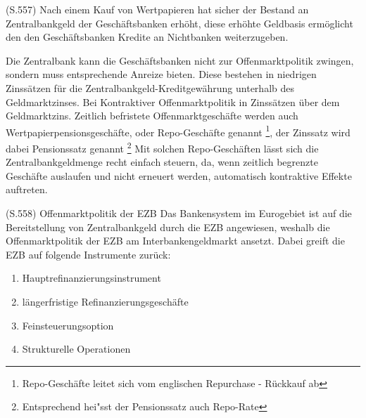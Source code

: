 \documentclass[
    onecolumn,
    a4paper,
    abstracton,
    parskip=half
    ,final
    ]{scrartcl}
\begin{document}
(S.557)
Nach einem Kauf von Wertpapieren hat sicher der Bestand an Zentralbankgeld der Gesch{\"a}ftsbanken erh{\"o}ht, diese erh{\"o}hte Geldbasis erm{\"o}glicht den den Gesch{\"a}ftsbanken Kredite an Nichtbanken weiterzugeben.

Die Zentralbank kann die Gesch{\"a}ftsbanken nicht zur Offenmarktpolitik zwingen, sondern muss entsprechende Anreize bieten. Diese bestehen in niedrigen Zinss{\"a}tzen f{\"u}r die Zentralbankgeld-Kreditgew{\"a}hrung unterhalb des Geldmarktzinses. Bei Kontraktiver Offenmarktpolitik in Zinss{\"a}tzen {\"u}ber dem Geldmarktzins.
Zeitlich befristete Offenmarktgesch{\"a}fte werden auch Wertpapierpensionsgesch{\"a}fte, oder Repo-Gesch{\"a}fte genannt \footnote[36]{Repo-Gesch{\"a}fte leitet sich vom englischen Repurchase - R{\"u}ckkauf ab}, der Zinssatz wird dabei Pensionssatz genannt \footnote[37]{Entsprechend hei{"ss}t der Pensionssatz auch Repo-Rate}
Mit solchen Repo-Gesch{\"a}ften l{\"a}sst sich die Zentralbankgeldmenge recht einfach steuern, da, wenn zeitlich begrenzte Gesch{\"a}fte auslaufen und nicht erneuert werden, automatisch kontraktive Effekte auftreten.


(S.558)
Offenmarktpolitik der EZB
Das Bankensystem im Eurogebiet ist auf die Bereitstellung von Zentralbankgeld durch die EZB angewiesen, weshalb die Offenmarktpolitik der EZB am Interbankengeldmarkt ansetzt. Dabei greift die EZB auf folgende Instrumente zur{\"u}ck:
\begin{enumerate}
  \item{Hauptrefinanzierungsinstrument}
  \item{l{\"a}ngerfristige Refinanzierungsgesch{\"a}fte}
  \item{Feinsteuerungsoption}
  \item{Strukturelle Operationen}
  \end{enumerate}
\end{document}
